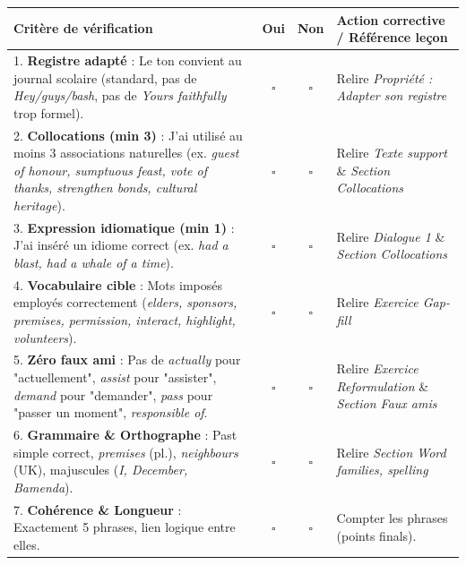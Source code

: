 \documentclass[11pt]{article}
\begin{document}
\begin{center}
\begin{tabularx}{\linewidth}{|X|c|c|X|}\hline
\rowcolor{popblueL} \textbf{Critère de vérification} & \textbf{Oui} & \textbf{Non} & \textbf{Action corrective / Référence leçon} \\ \hline
1. \textbf{Registre adapté} : Le ton convient au journal scolaire (standard, pas de \textit{Hey/guys/bash}, pas de \textit{Yours faithfully} trop formel). & $\square$ & $\square$ & Relire \textit{Propriété : Adapter son registre} \\ \hline
2. \textbf{Collocations (min 3)} : J'ai utilisé au moins 3 associations naturelles (ex. \textit{guest of honour, sumptuous feast, vote of thanks, strengthen bonds, cultural heritage}). & $\square$ & $\square$ & Relire \textit{Texte support} \& \textit{Section Collocations} \\ \hline
3. \textbf{Expression idiomatique (min 1)} : J'ai inséré un idiome correct (ex. \textit{had a blast, had a whale of a time}). & $\square$ & $\square$ & Relire \textit{Dialogue 1} \& \textit{Section Collocations} \\ \hline
4. \textbf{Vocabulaire cible} : Mots imposés employés correctement (\textit{elders, sponsors, premises, permission, interact, highlight, volunteers}). & $\square$ & $\square$ & Relire \textit{Exercice Gap-fill} \\ \hline
5. \textbf{Zéro faux ami} : Pas de \textit{actually} pour "actuellement", \textit{assist} pour "assister", \textit{demand} pour "demander", \textit{pass} pour "passer un moment", \textit{responsible of}. & $\square$ & $\square$ & Relire \textit{Exercice Reformulation} \& \textit{Section Faux amis} \\ \hline
6. \textbf{Grammaire \& Orthographe} : Past simple correct, \textit{premises} (pl.), \textit{neighbours} (UK), majuscules (\textit{I, December, Bamenda}). & $\square$ & $\square$ & Relire \textit{Section Word families, spelling} \\ \hline
7. \textbf{Cohérence \& Longueur} : Exactement 5 phrases, lien logique entre elles. & $\square$ & $\square$ & Compter les phrases (points finals). \\ \hline
\end{tabularx}
\end{center}
\end{document}
